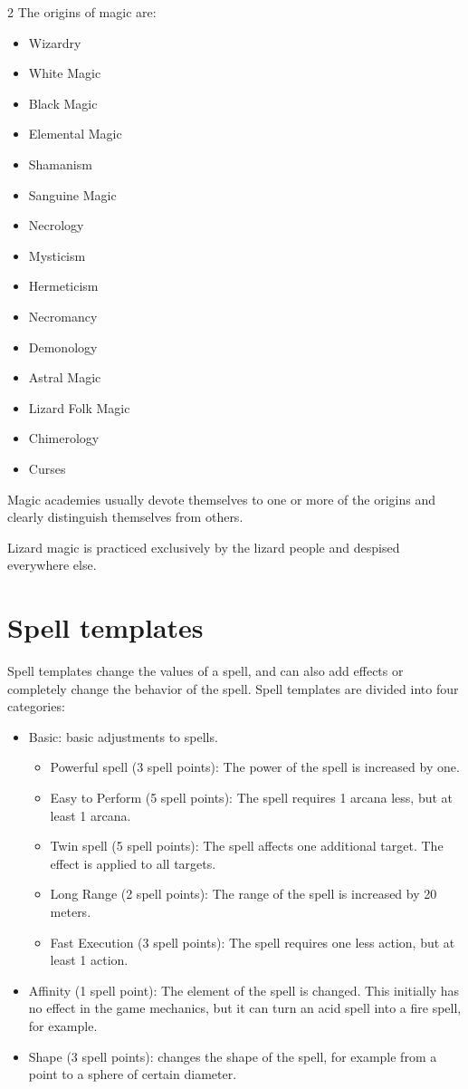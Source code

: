 \begin{multicols}{2}
The origins of magic are:
\begin{itemize}
    \item Wizardry
    \item White Magic
    \item Black Magic
    \item Elemental Magic
    \item Shamanism
    \item Sanguine Magic
    \item Necrology
    \item Mysticism
    \item Hermeticism
    \item Necromancy
    \item Demonology
    \item Astral Magic
    \item Lizard Folk Magic
    \item Chimerology
    \item Curses
\end{itemize}

Magic academies usually devote themselves to one or more of the origins and clearly distinguish themselves from others.

Lizard magic is practiced exclusively by the lizard people and despised everywhere else.

\section{Spell templates}

Spell templates change the values of a spell, and can also add effects or completely change the behavior of the spell. Spell templates are divided into four categories:
\begin{itemize}
    \item Basic: basic adjustments to spells.
    \begin{itemize}
        \item Powerful spell (3 spell points): The power of the spell is increased by one.
        \item Easy to Perform (5 spell points): The spell requires 1 arcana less, but at least 1 arcana.
        \item Twin spell (5 spell points): The spell affects one additional target. The effect is applied to all targets.
        \item Long Range (2 spell points): The range of the spell is increased by 20 meters.
        \item Fast Execution (3 spell points): The spell requires one less action, but at least 1 action.
    \end{itemize}
    \item Affinity (1 spell point): The element of the spell is changed. This initially has no effect in the game mechanics, but it can turn an acid spell into a fire spell, for example.
    \item Shape (3 spell points): changes the shape of the spell, for example from a point to a sphere of certain diameter.
\end{itemize}


\end{multicols}
